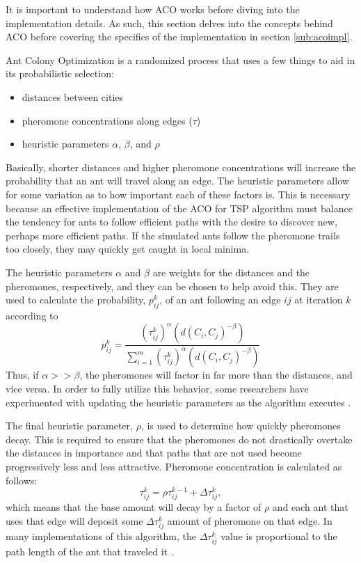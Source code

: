 \documentclass[twocolumn]{article}
\begin{document}
It is important to understand how ACO works before diving into 
the implementation details. As such, this section delves
into the concepts behind ACO before covering the
specifics of the implementation in section \ref{sub:acoimpl}. 

Ant Colony Optimization is a randomized process that uses a few things to aid
in its probabilistic selection:
\begin{itemize}
\item distances between cities
\item pheromone concentrations along edges ($\tau$)
\item heuristic parameters $\alpha$, $\beta$, and $\rho$
\end{itemize}
Basically, shorter distances and higher pheromone concentrations will
increase the probability that an ant will travel along an edge. The 
heuristic parameters allow for some variation as to how important 
each of these factors is. This is necessary because an effective 
implementation of the ACO for TSP algorithm must balance the tendency
for ants to follow efficient paths with the desire to discover new, 
perhaps more efficient paths. If the simulated ants follow the 
pheromone trails too closely, they may quickly get caught in local
minima. 

The heuristic parameters $\alpha$ and $\beta$ are weights for the distances and 
the pheromones, respectively, and they can be chosen to help avoid this. They 
are used to calculate the probability, $p^k_{ij}$, of an ant following an edge
$ij$ at iteration $k$ according to 
\begin{equation}
p_{ij}^k = \frac{(\tau^k_{ij})^\alpha(d(C_i,C_j)^{-\beta})}{\displaystyle \sum_{i=1}^m 
  (\tau^k_{ij})^\alpha(d(C_i,C_j)^{-\beta})} \label{eq:probs}
\end{equation}
Thus, if $\alpha >> \beta$, the pheromones will factor in far more than the
distances, and vice versa. In order to fully utilize this behavior, 
some researchers have experimented with 
updating the heuristic parameters as the algorithm executes \cite{ipcsit:aco}.

The final heuristic parameter, $\rho$, is used to 
determine how quickly pheromones decay. This is required to ensure that the pheromones do not
drastically overtake the distances in importance and that paths that are not used become 
progressively less and less attractive. Pheromone concentration is calculated as follows:
\begin{equation}
\tau^k_{ij} = \rho \tau^{k-1}_{ij} + \Delta \tau^k_{ij}, \label{eq:phers}
\end{equation}
which means that the base amount will decay by a factor of $\rho$ and each ant
that uses that edge will deposit some $\Delta\tau^k_{ij}$ amount of pheromone on
that edge. In many implementations of this algorithm, the $\Delta\tau^k_{ij}$
value is proportional to the path length of the ant that traveled it \cite{iridia:aco} 
\cite{ipcsit:aco} \cite{jungblut:aco}.  
\end{document}
